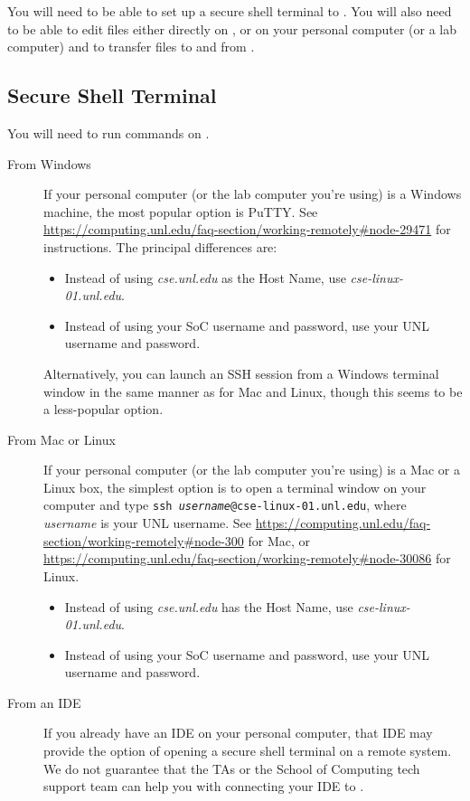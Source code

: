 

You will need to be able to set up a secure shell terminal to \runtimeenvironment.
You will also need to be able to edit files either directly on \runtimeenvironment, or on your personal computer (or a lab computer) and to transfer files to and from \runtimeenvironment.

\subsection{Secure Shell Terminal}

You will need to run commands on \runtimeenvironment.

\begin{description}
    \item[From Windows] If your personal computer (or the lab computer you're using) is a Windows machine, the most popular option is PuTTY\@.
        See \url{https://computing.unl.edu/faq-section/working-remotely#node-29471} for instructions.
        The principal differences are:
        \begin{itemize}
            \item Instead of using \textit{cse.unl.edu} as the Host Name, use \textit{cse-linux-01.unl.edu}.
            \item Instead of using your SoC username and password, use your UNL username and password.
        \end{itemize}
        Alternatively, you can launch an SSH session from a Windows terminal window in the same manner as for Mac and Linux, though this seems to be a less-popular option.
    \item[From Mac or Linux] If your personal computer (or the lab computer you're using) is a Mac or a Linux box, the simplest option is to open a terminal window on your computer and type \texttt{ssh \textit{username}@cse-linux-01.unl.edu}, where \textit{username} is your UNL username.
        See \url{https://computing.unl.edu/faq-section/working-remotely#node-300} for Mac, or \url{https://computing.unl.edu/faq-section/working-remotely#node-30086} for Linux.
        \begin{itemize}
            \item Instead of using \textit{cse.unl.edu} has the Host Name, use \textit{cse-linux-01.unl.edu}.
            \item Instead of using your SoC username and password, use your UNL username and password.
        \end{itemize}
    \item[From an IDE] If you already have an IDE on your personal computer, that IDE may provide the option of opening a secure shell terminal on a remote system.
        We do not guarantee that the TAs or the School of Computing tech support team can help you with connecting your IDE to \runtimeenvironment.
\end{description}


